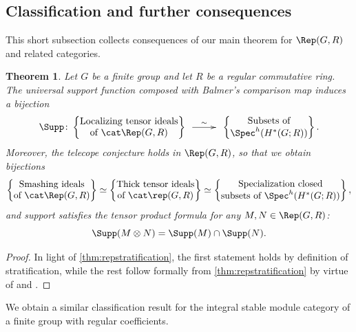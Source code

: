 \documentclass{amsart}%
\numberwithin{equation}{section}%
\newtheorem{Thm}[subsection]{Theorem}
\theoremstyle{remark}
\begin{document}
\subsection{Classification and further consequences}\label{ssec:applications}

This short subsection collects consequences of our main theorem for $\Rep(G,R)$ and related categories.


\begin{Thm}\label{thm:repconsequences}
Let $G$ be a finite group and let $R$ be a regular commutative ring. The universal support function composed with Balmer's comparison map induces a bijection
\[
\Supp\colon\begin{Bmatrix}
\text{Localizing tensor ideals} \\
\text{of } \cat \Rep(G,R)
\end{Bmatrix} 
\xymatrix@C=2pc{ \ar[r]^-{\sim} &}
\begin{Bmatrix}
\text{Subsets of}  \\
\Spec^h(H^*(G;R))
\end{Bmatrix}.
\]
Moreover, the telecope conjecture holds in $\Rep(G,R)$, so that we obtain bijections
\[
\begin{Bmatrix}
\text{Smashing ideals} \\
\text{of } \cat \Rep(G,R)
\end{Bmatrix} 
\simeq
\begin{Bmatrix}
\text{Thick tensor ideals} \\
\text{of } \cat \rep(G,R)
\end{Bmatrix} 
\simeq
\begin{Bmatrix}
\text{Specialization closed}  \\
\text{subsets of } \Spec^h(H^*(G;R))
\end{Bmatrix},
\]
and support satisfies the tensor product formula for any $M,N \in \Rep(G,R)$:
\[
\Supp(M \otimes N) = \Supp(M) \cap \Supp(N).
\]
\end{Thm}
\begin{proof}
In light of \cref{thm:repstratification}, the first statement holds by definition of stratification, while the rest follow formally from \cref{thm:repstratification} by virtue of \cite[Thm.~8.1]{bhs1} and \cite[Thm.~9.11]{bhs1}.
\end{proof}

We obtain a similar classification result for the integral stable module category of a finite group with regular coefficients. 
\end{document}
